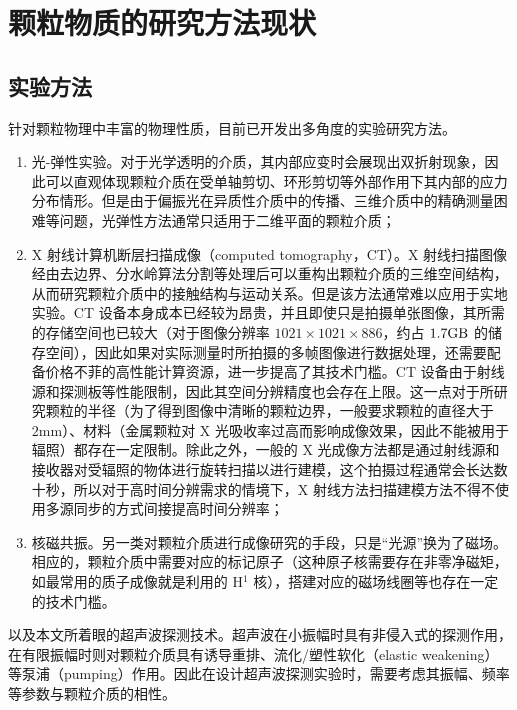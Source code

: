 \section{颗粒物质的研究方法现状}


\subsection{实验方法}

针对颗粒物理中丰富的物理性质，目前已开发出多角度的实验研究方法。

\begin{enumerate}
  \item 光-弹性实验\cite{photoelasticimetry}。对于光学透明的介质，其内部应变时会展现出双折射现象，因此可以直观体现颗粒介质在受单轴剪切、环形剪切等外部作用下其内部的应力分布情形。但是由于偏振光在异质性介质中的传播、三维介质中的精确测量困难等问题\cite{Non-Destructive_3D_Photoelasticity}，光弹性方法通常只适用于二维平面的颗粒介质；
  \item X 射线计算机断层扫描成像（computed tomography，CT）\cite{PhysRevE.68.020301}。X 射线扫描图像经由去边界、分水岭算法分割等处理后可以重构出颗粒介质的三维空间结构，从而研究颗粒介质中的接触结构与运动关系。但是该方法通常难以应用于实地实验。CT 设备本身成本已经较为昂贵，并且即使只是拍摄单张图像，其所需的存储空间也已较大（对于图像分辨率 $1021\times 1021 \times 886$，约占 $1.7\unit{\giga\byte}$ 的储存空间），因此如果对实际测量时所拍摄的多帧图像进行数据处理，还需要配备价格不菲的高性能计算资源，进一步提高了其技术门槛。CT 设备由于射线源和探测板等性能限制，因此其空间分辨精度也会存在上限。这一点对于所研究颗粒的半径（为了得到图像中清晰的颗粒边界，一般要求颗粒的直径大于 $2\unit{\milli\meter}$）、材料（金属颗粒对 X 光吸收率过高而影响成像效果，因此不能被用于辐照）都存在一定限制。除此之外，一般的 X 光成像方法都是通过射线源和接收器对受辐照的物体进行旋转扫描以进行建模，这个拍摄过程通常会长达数十秒，所以对于高时间分辨需求的情境下，X 射线方法扫描建模方法不得不使用多源同步\cite{wang2008ultrafast}的方式间接提高时间分辨率；
  \item 核磁共振\cite{CLARKE2023}。另一类对颗粒介质进行成像研究的手段，只是“光源”换为了磁场。相应的，颗粒介质中需要对应的标记原子（这种原子核需要存在非零净磁矩，如最常用的质子成像就是利用的 H$^{1}$ 核），搭建对应的磁场线圈等也存在一定的技术门槛。
\end{enumerate}

以及本文所着眼的超声波探测技术。超声波在小振幅时具有非侵入式的探测作用，在有限振幅时则对颗粒介质具有诱导重排\cite{PhysRevE.84.020301}、流化/塑性软化（elastic weakening）\cite{PhysRevE.84.020301}等泵浦（pumping）作用。因此在设计超声波探测实验时，需要考虑其振幅、频率等参数与颗粒介质的相性。

